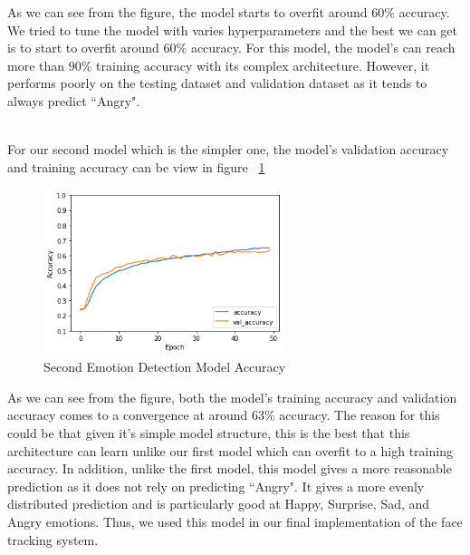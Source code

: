 \documentclass[10pt,twocolumn,letterpaper]{article}
\begin{document}
As we can see from the figure, the model starts to overfit around $60\%$ accuracy. We tried to tune the model with varies hyperparameters and the best we can get is to start to overfit around $60\%$ accuracy. For this model, the model's can reach more than $90\%$ training accuracy with its complex architecture. However, it performs poorly on the testing dataset and validation dataset as it tends to always predict ``Angry". 

\\
For our second model which is the simpler one, the model's validation accuracy and training accuracy can be view in figure ~\ref{fig:simple_model_result}
\begin{figure}[h]
    \centering
    \includegraphics[width=7cm]{simple_model_result.png}
    \caption{Second Emotion Detection Model Accuracy}
    \label{fig:simple_model_result}
\end{figure}

As we can see from the figure, both the model's training accuracy and validation accuracy comes to a convergence at around $63\%$ accuracy. The reason for this could be that given it's simple model structure, this is the best that this architecture can learn unlike our first model which can overfit to a high training accuracy. In addition, unlike the first model, this model gives a more reasonable prediction as it does not rely on predicting ``Angry". It gives a more evenly distributed prediction and is particularly good at Happy, Surprise, Sad, and Angry emotions. Thus, we used this model in our final implementation of the face tracking system.  
\end{document}
